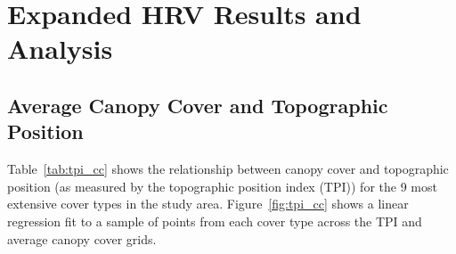 \chapter{Expanded HRV Results and Analysis}
\label{app:full-results}

\section{Average Canopy Cover and Topographic Position}
Table~\ref{tab:tpi_cc} shows the relationship between canopy cover and topographic position (as measured by the topographic position index (TPI)) for the 9 most extensive cover types in the study area. Figure~\ref{fig:tpi_cc} shows a linear regression fit to a sample of points from each cover type across the TPI and average canopy cover grids.



